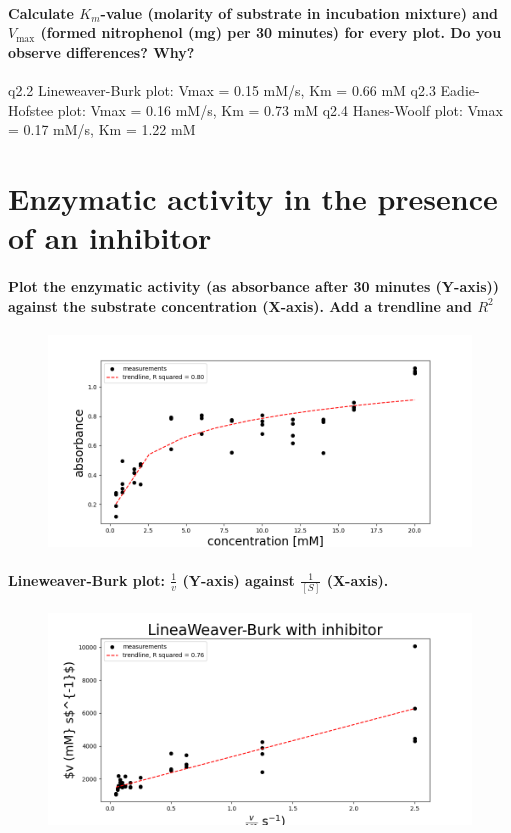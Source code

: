 \documentclass[a4paper,12pt]{article}
\begin{document}
\paragraph{Calculate $K_m$-value (molarity of substrate in incubation mixture) and $V_{\text{max}}$ (formed nitrophenol (mg) per 30 minutes) for every plot. Do you observe 
differences? Why? 
}

q2.2 Lineweaver-Burk plot: Vmax = 0.15 mM/s, Km = 0.66 mM
q2.3 Eadie-Hofstee plot: Vmax = 0.16 mM/s, Km = 0.73 mM
q2.4 Hanes-Woolf plot: Vmax = 0.17 mM/s, Km = 1.22 mM

\section{Enzymatic activity in the presence of an inhibitor}

\paragraph{Plot the enzymatic activity (as absorbance after 30 minutes (Y-axis)) 
against the substrate concentration (X-axis). Add a trendline and $R^2$}

\begin{figure}[!ht]
    \includegraphics[scale=0.5]{fig3_1.png}
    \centering
\end{figure}

\paragraph{Lineweaver-Burk plot: $\frac{1}{v}$ (Y-axis) against $\frac{1}{[S]}$ (X-axis).}

\begin{figure}[!ht]
    \includegraphics[scale=0.5]{fig3_2.png}
    \centering
\end{figure}
\end{document}
